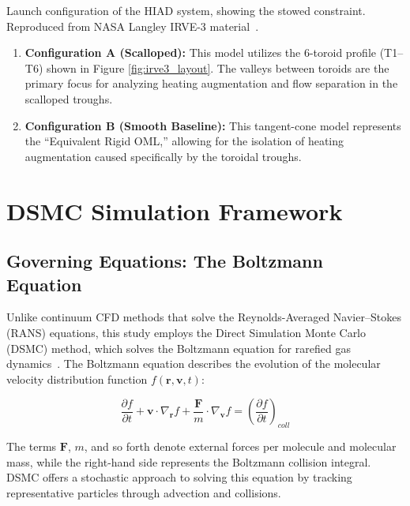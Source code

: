 Launch configuration of the HIAD system, showing the stowed constraint. Reproduced from NASA Langley IRVE-3 material~\cite{dillman2015irve3}.


\begin{enumerate}
    \item \textbf{Configuration A (Scalloped):} This model utilizes the 6-toroid profile (T1--T6) shown in Figure \ref{fig:irve3_layout}. The valleys between toroids are the primary focus for analyzing heating augmentation and flow separation in the scalloped troughs.

    \item \textbf{Configuration B (Smooth Baseline):} This tangent-cone model represents the ``Equivalent Rigid OML,'' allowing for the isolation of heating augmentation caused specifically by the toroidal troughs.
\end{enumerate}

\section{DSMC Simulation Framework}

\subsection{Governing Equations: The Boltzmann Equation}
Unlike continuum CFD methods that solve the Reynolds-Averaged Navier--Stokes (RANS) equations, this study employs the Direct Simulation Monte Carlo (DSMC) method, which solves the Boltzmann equation for rarefied gas dynamics~\cite{bird1994molecular}. The Boltzmann equation describes the evolution of the molecular velocity distribution function $f(\mathbf{r}, \mathbf{v}, t)$:

\begin{equation}
    \frac{\partial f}{\partial t} + \mathbf{v} \cdot \nabla_{\mathbf{r}} f + \frac{\mathbf{F}}{m} \cdot \nabla_{\mathbf{v}} f = \left(\frac{\partial f}{\partial t}\right)_{coll}
\end{equation}

The terms $\mathbf{F}$, $m$, and so forth denote external forces per molecule and molecular mass, while the right-hand side represents the Boltzmann collision integral. DSMC offers a stochastic approach to solving this equation by tracking representative particles through advection and collisions.

